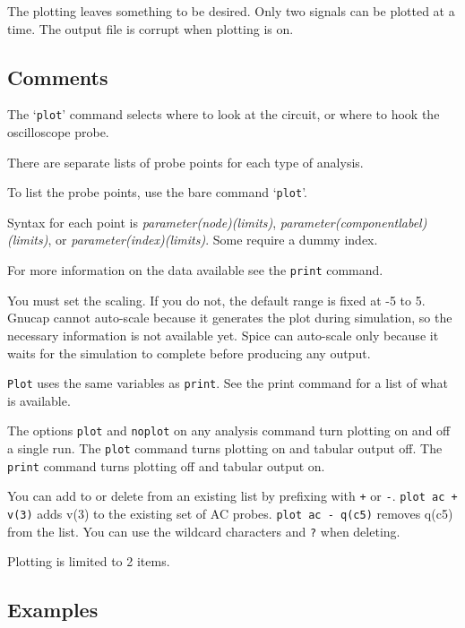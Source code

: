 The plotting leaves something to be desired.  Only two signals can be
plotted at a time.  The output file is corrupt when plotting is on.
\subsection{Comments}

The `{\tt plot}' command selects where to look at the circuit, or where to
hook the oscilloscope probe.

There are separate lists of probe points for each type of analysis.

To list the probe points, use the bare command `{\tt plot}'.

Syntax for each point is {\it parameter(node)(limits)}, {\it
parameter(componentlabel)(limits)}, or {\it parameter(index)(limits)}.
Some require a dummy index.

For more information on the data available see the {\tt print} command.

You must set the scaling.  If you do not, the default range is fixed
at -5 to 5.  Gnucap cannot auto-scale because it generates the plot
during simulation, so the necessary information is not available yet.
Spice can auto-scale only because it waits for the simulation to
complete before producing any output.

{\tt Plot} uses the same variables as {\tt print}.  See the print command 
for a list of what is available.

The options {\tt plot} and {\tt noplot} on any analysis command turn
plotting on and off a single run.  The {\tt plot} command turns 
plotting on and tabular output off.  The {\tt print} command turns plotting 
off and tabular output on.

You can add to or delete from an existing list by prefixing with
{\tt +} or {\tt -}.  {\tt plot ac + v(3)} adds v(3) to the existing
set of AC probes.  {\tt plot ac - q(c5)} removes q(c5) from the
list.  You can use the wildcard characters {\tt *} and {\tt ?} when
deleting.

Plotting is limited to 2 items.
\subsection{Examples}

